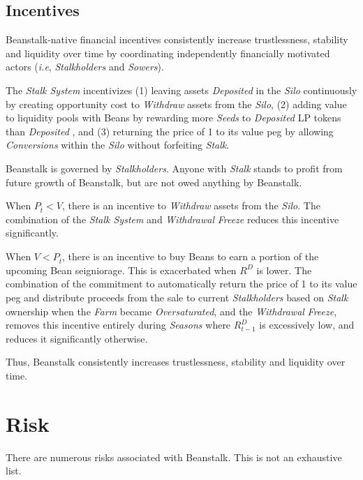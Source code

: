 \documentclass[tikz]{article}
\newcommand{\term}[1]{\textsl{#1}}
\newcommand{\Bean}{} %
\begin{document}
\subsection{Incentives}
Beanstalk-native financial incentives consistently increase trustlessness, stability and liquidity over time by coordinating independently financially motivated actors (\term{i.e}, \term{Stalkholders} and \term{Sowers}). 

The \term{Stalk System} incentivizes (1) leaving assets \term{Deposited} in the \term{Silo} continuously by creating opportunity cost to \term{Withdraw} assets from the \term{Silo}, (2) adding value to liquidity pools with Beans by rewarding more \term{Seeds} to \term{Deposited} LP tokens than \term{Deposited} \Bean, and (3) returning the price of \Bean1 to its value peg by allowing \term{Conversions} within the \term{Silo} without forfeiting \term{Stalk}.

Beanstalk is governed by \term{Stalkholders}. Anyone with \term{Stalk} stands to profit from future growth of Beanstalk, but are not owed anything by Beanstalk. 

When $P_{\overline{t}} < V$, there is an incentive to \term{Withdraw} assets from the \term{Silo}. The combination of the \term{Stalk System} and \term{Withdrawal} \term{Freeze} reduces this incentive significantly.

When $V < P_{\overline{t}}$, there is an incentive to buy Beans to earn a portion of the upcoming Bean seigniorage. This is exacerbated when $R^D$ is lower. The combination of the commitment to automatically return the price of \Bean1 to its value peg and distribute proceeds from the sale to current \term{Stalkholders} based on \term{Stalk} ownership when the \term{Farm} became \term{Oversaturated}, and the \term{Withdrawal} \term{Freeze}, removes this incentive entirely during \term{Seasons} where $R^D_{t-1}$ is excessively low, and reduces it significantly otherwise.

Thus, Beanstalk consistently increases trustlessness, stability and liquidity over time.

\section{Risk}
There are numerous risks associated with Beanstalk. This is not an exhaustive list.
\end{document}
